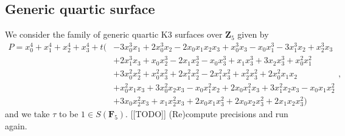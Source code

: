 \documentclass[a4paper,11pt]{article}
\numberwithin{equation}{section}
\newcommand{\ZZ}{\mathbf{Z}} %
\newcommand{\FF}{\mathbf{F}} %
\theoremstyle{definition}
\begin{document}
\begin{comment} The computation of the connection matrix is near instantaneous 
again, although in this case this is largely due to the sparseness 
of multivariate polynomial defining the family.  The Frobenius 
matrix for the fibre at $t = 0$ is determined in $0.02$~seconds 
($45.26$~minutes).  The local solutions $C(t)$ and $C(t)^{-1}$ 
require $0.27$ and $0.08$ seconds, which together with the 
computation local expansion of Frobenius in $0.15$ seconds 
yields $0.5$~seconds ($19.9$~minutes).  The analytic continuation, 
evaluation at the Teichm\"uller lift of $t_1$  and construction 
of the $q$th-power Frobenius take $0.02$, $0.04$ and $0.62$ seconds, 
respectively, adding up to $0.68$~seconds ($18.66$~minutes).  The 
root-unitary polynomial that we find is given by 
\begin{align*}
3^{20} p\bigl(3^{-20} T\bigr) & = 
  -3486784401 T^{21} - 39675197243 T^{20} - 191506614866 T^{19} \\
& \quad - 482588946510 T^{18} - 552821487569 T^{17} + 243001138765 T^{16} \\
& \quad + 1641410078472 T^{15} + 1793016627512 T^{14} - 410199003010 T^{13} \\
& \quad - 2617001208822 T^{12} - 1586643774924 T^{11} + 1586643774924 T^{10} \\
& \quad + 2617001208822 T^9 + 410199003010 T^8 - 1793016627512 T^7 \\
& \quad - 1641410078472 T^6 - 243001138765 T^5 + 552821487569 T^4 \\
& \quad + 482588946510 T^3 + 191506614866 T^2 + 39675197243 T + 3486784401.
\end{align*}

\end{comment}

\subsection{Generic quartic surface}

We consider the family of generic quartic K3 surfaces over $\ZZ_5$ given by 
\begin{equation*}
\begin{split}
P=x_0^4 + x_1^4 + x_2^4 + x_3^4 
+ t \bigl( & -3 x_0^3 x_1 + 2 x_0^3 x_2 - 2 x_0 x_1 x_2 x_3 + x_0^3 x_3 - x_0 x_1^3 - 3 x_1^3 x_2 + x_2^3 x_3 \\ &
          + 2 x_1^3 x_3 + x_0 x_2^3 - 2 x_1 x_2^3 - x_0 x_3^3 + x_1 x_3^3 + 3 x_2 x_3^3 + x_0^2 x_1^2 \\ & 
          + 3 x_0^2 x_2^2 + x_0^2 x_3^2 + 2 x_1^2 x_2^2 - 2 x_1^2 x_3^2 + x_2^2 x_3^2 
          + 2 x_0^2 x_1 x_2 \\ & + x_0^2 x_1 x_3 + 3 x_0^2 x_2 x_3 - x_0 x_1^2 x_2 + 2 x_0 x_1^2 x_3 
          + 3 x_1^2 x_2 x_3 - x_0 x_1 x_2^2 \\ & 
          + 3 x_0 x_2^2 x_3 + x_1 x_2^2 x_3 + 2 x_0 x_1 x_3^2 + 2 x_0 x_2 x_3^2 + 2 x_1 x_2 x_3^2 \bigr)
\end{split},
\end{equation*}
and we take $\tau$ to be  $1 \in S(\FF_5)$. [[TODO]] (Re)compute precisions and run again.
\end{document}
